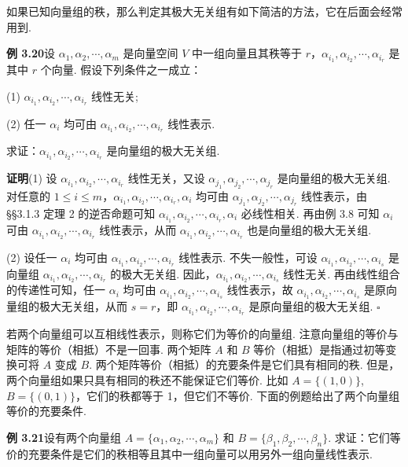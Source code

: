 \documentclass[UTF8,12pt,a4paper,fontset=fandol]{ctexart}
\begin{document}
如果已知向量组的秩，那么判定其极大无关组有如下简洁的方法，它在后面会经常用到.

\noindent\textbf{例 3.20}\quad 设 $\alpha_1,\alpha_2,\cdots,\alpha_m$ 是向量空间 $V$ 中一组向量且其秩等于 $r$，$\alpha_{i_1},\alpha_{i_2},\cdots,\alpha_{i_r}$ 是其中 $r$ 个向量. 假设下列条件之一成立：

(1) $\alpha_{i_1},\alpha_{i_2},\cdots,\alpha_{i_r}$ 线性无关;

(2) 任一 $\alpha_i$ 均可由 $\alpha_{i_1},\alpha_{i_2},\cdots,\alpha_{i_r}$ 线性表示.

求证：$\alpha_{i_1},\alpha_{i_2},\cdots,\alpha_{i_r}$ 是向量组的极大无关组.

\noindent\textbf{证明}\quad (1) 设 $\alpha_{i_1},\alpha_{i_2},\cdots,\alpha_{i_r}$ 线性无关，又设 $\alpha_{j_1},\alpha_{j_2},\cdots,\alpha_{j_r}$ 是向量组的极大无关组. 对任意的 $1\le i\le m$，$\alpha_{i_1},\alpha_{i_2},\cdots,\alpha_{i_r},\alpha_i$ 均可由 $\alpha_{j_1},\alpha_{j_2},\cdots,\alpha_{j_r}$ 线性表示，由 §§3.1.3 定理 2 的逆否命题可知 $\alpha_{i_1},\alpha_{i_2},\cdots,\alpha_{i_r},\alpha_i$ 必线性相关. 再由例 3.8 可知 $\alpha_i$ 可由 $\alpha_{i_1},\alpha_{i_2},\cdots,\alpha_{i_r}$ 线性表示，从而 $\alpha_{i_1},\alpha_{i_2},\cdots,\alpha_{i_r}$ 也是向量组的极大无关组.

(2) 设任一 $\alpha_i$ 均可由 $\alpha_{i_1},\alpha_{i_2},\cdots,\alpha_{i_r}$ 线性表示. 不失一般性，可设 $\alpha_{i_1},\alpha_{i_2},\cdots,\alpha_{i_s}$ 是向量组 $\alpha_{i_1},\alpha_{i_2},\cdots,\alpha_{i_r}$ 的极大无关组. 因此，$\alpha_{i_1},\alpha_{i_2},\cdots,\alpha_{i_s}$ 线性无关. 再由线性组合的传递性可知，任一 $\alpha_i$ 均可由 $\alpha_{i_1},\alpha_{i_2},\cdots,\alpha_{i_s}$ 线性表示，故 $\alpha_{i_1},\alpha_{i_2},\cdots,\alpha_{i_s}$ 是原向量组的极大无关组，从而 $s=r$，即 $\alpha_{i_1},\alpha_{i_2},\cdots,\alpha_{i_r}$ 是原向量组的极大无关组. $\square$

若两个向量组可以互相线性表示，则称它们为等价的向量组. 注意向量组的等价与矩阵的等价（相抵）不是一回事. 两个矩阵 $A$ 和 $B$ 等价（相抵）是指通过初等变换可将 $A$ 变成 $B$. 两个矩阵等价（相抵）的充要条件是它们具有相同的秩. 但是，两个向量组如果只具有相同的秩还不能保证它们等价. 比如 $A=\{(1,0)\}$, $B=\{(0,1)\}$，它们的秩都等于 1，但它们不等价. 下面的例题给出了两个向量组等价的充要条件.

\noindent\textbf{例 3.21}\quad 设有两个向量组 $A=\{\alpha_1,\alpha_2,\cdots,\alpha_m\}$ 和 $B=\{\beta_1,\beta_2,\cdots,\beta_n\}$. 求证：它们等价的充要条件是它们的秩相等且其中一组向量可以用另外一组向量线性表示.
\end{document}
